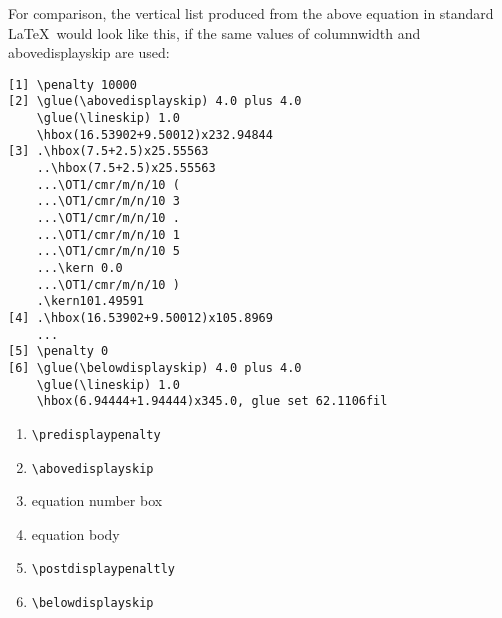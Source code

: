 \documentclass{article}
\providecommand*\cs[1]{\texttt{\textbackslash#1}}
\begin{document}
For comparison, the vertical list produced from the above equation in
standard \LaTeX\ would look like this, if the same values of
columnwidth and abovedisplayskip are used:
\begin{verbatim}
[1] \penalty 10000 
[2] \glue(\abovedisplayskip) 4.0 plus 4.0 
    \glue(\lineskip) 1.0 
    \hbox(16.53902+9.50012)x232.94844 
[3] .\hbox(7.5+2.5)x25.55563 
    ..\hbox(7.5+2.5)x25.55563 
    ...\OT1/cmr/m/n/10 ( 
    ...\OT1/cmr/m/n/10 3 
    ...\OT1/cmr/m/n/10 . 
    ...\OT1/cmr/m/n/10 1 
    ...\OT1/cmr/m/n/10 5 
    ...\kern 0.0 
    ...\OT1/cmr/m/n/10 ) 
    .\kern101.49591 
[4] .\hbox(16.53902+9.50012)x105.8969 
    ... 
[5] \penalty 0 
[6] \glue(\belowdisplayskip) 4.0 plus 4.0 
    \glue(\lineskip) 1.0 
    \hbox(6.94444+1.94444)x345.0, glue set 62.1106fil
\end{verbatim}

\begin{enumerate}
  \item \cs{predisplaypenalty}
  \item \cs{abovedisplayskip} 
  \item  equation number box
  \item equation body 
  \item \cs{postdisplaypenaltly}  
  \item \cs{belowdisplayskip}
\end{enumerate}
\end{document}

